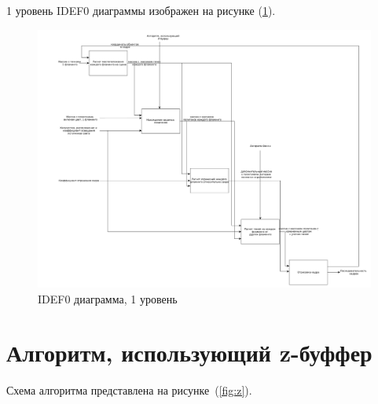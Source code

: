 1 уровень IDEF0 диаграммы изображен на рисунке (\ref{fig:idef1}).

\begin{figure}[h!]
	\centering
	\includegraphics[width=\linewidth]{img/idef1}
	\caption{IDEF0 диаграмма, 1 уровень}
	\label{fig:idef1}
\end{figure}


\section{Алгоритм, использующий z-буффер}

Схема алгоритма представлена на рисунке~(\ref{fig:z}).

